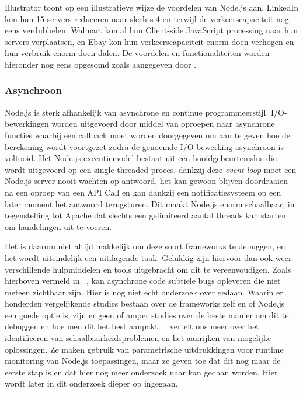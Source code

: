 Illustrator \textcite{Mehmet2016} toont op een illustratieve wijze de voordelen van Node.js aan. LinkedIn kon hun 15 servers reduceren naar slechts 4 en terwijl de verkeerscapaciteit nog eens verdubbelen. Walmart kon al hun Client-side JavaScript processing naar hun servers verplaatsen, en Ebay kon hun verkeerscapaciteit enorm doen verhogen en hun verbruik enorm doen dalen. De voordelen en functionaliteiten worden hieronder nog eens opgesomd zoals aangegeven door \textcite{Chandrayan2017}.

\subsubsection{Asynchroon}
\label{sec:async}

Node.js is sterk afhankelijk van asynchrone en continue programmeerstijl. I/O-bewerkingen worden uitgevoerd door middel van oproepen naar asynchrone functies waarbij een callback moet worden doorgegeven om aan te geven hoe de berekening wordt voortgezet zodra de genoemde I/O-bewerking asynchroon is voltooid. Het Node.js executiemodel bestaat uit een hoofdgebeurtenislus die wordt uitgevoerd op een single-threaded proces. dankzij deze \textit{event loop} moet een Node.js server nooit wachten op antwoord, het kan gewoon blijven doordraaien na een oproep van een API Call en kan dankzij een notificatiesysteem op een later moment het antwoord terugsturen. Dit maakt Node.js enorm schaalbaar, in tegenstelling tot Apache dat slechts een gelimiteerd aantal threads kan starten om handelingen uit te voeren.

Het is daarom niet altijd makkelijk om deze soort frameworks te debuggen, en het wordt uiteindelijk een uitdagende taak. Gelukkig zijn hiervoor dan ook weer verschillende hulpmiddelen en tools uitgebracht om dit te vereenvoudigen. Zoals hierboven vermeld in ~\autocite{Runtime2017}, kan asynchrone code subtiele bugs opleveren die niet meteen zichtbaar zijn.  Hier is nog niet echt onderzoek over gedaan. Waarin er honderden vergelijkende studies bestaan over de frameworks zelf en of Node.js een goede optie is, zijn er geen of amper studies over de beste manier om dit te debuggen en hoe men dit het best aanpakt. ~\autocite{Runtime2017} vertelt ons meer over het identificeren van schaalbaarheidsproblemen en het aanrijken van mogelijke oplossingen. Ze maken gebruik van parametrische uitdrukkingen voor runtime monitoring van Node.js toepassingen, maar ze geven toe dat dit nog maar de eerste stap is en dat hier nog meer onderzoek naar kan gedaan worden. Hier wordt later in dit onderzoek dieper op ingegaan.

